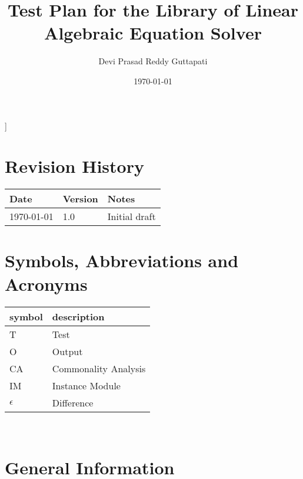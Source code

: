 \documentclass[12pt, titlepage]{article}
\begin{document}
\title{Test Plan for the Library of Linear Algebraic Equation Solver }

\author{Devi Prasad Reddy Guttapati}

\date{\today}





\maketitle



]
\section{\bf Revision History}
\begin{tabularx}{\textwidth}{p{3cm}p{2cm}X}
\toprule {\bf Date} & {\bf Version} & {\bf Notes}\\
\midrule
\today & 1.0 & Initial draft\\

\bottomrule
\end{tabularx}


\newpage


\section{Symbols, Abbreviations and Acronyms}

\renewcommand{\arraystretch}{1.2}
\begin{tabular}{l l} 
  \toprule		
  \textbf{symbol} & \textbf{description}\\
  \midrule 
  T & Test\\
O & Output\\
CA & Commonality Analysis\\
IM & Instance Module\\
$\epsilon$ & Difference\\


  \bottomrule
\end{tabular}\\

\newpage

\tableofcontents

\listoftables




\newpage




\section{General Information}
\end{document}
